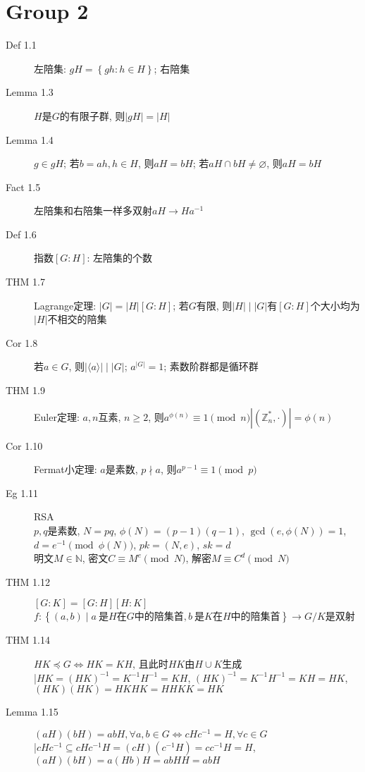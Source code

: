 \documentclass{article}
\renewcommand{\l}{\left}
\renewcommand{\r}{\right}
\begin{document}
    \section{Group 2}
    \begin{description}
        \item[Def 1.1] 左陪集: $gH = \l\{ gh : h \in H \r\}$; 右陪集
        \item[Lemma 1.3] $H$是$G$的有限子群, 则$\l| gH \r| = \l| H \r|$
        \item[Lemma 1.4] $g \in gH$; 若$b = ah, h \in H$, 则$aH = bH$; 若$aH \cap bH \ne \varnothing$, 则$aH = bH$
        \item[Fact 1.5] 左陪集和右陪集一样多\hfill 双射$aH \to Ha^{-1}$
        \item[Def 1.6] 指数$[G:H]$: 左陪集的个数
        \item[THM 1.7] Lagrange定理: $\l|G\r| = \l|H\r|[G:H]$; 若$G$有限, 则$\l|H\r| \mid \l|G\r|$\hfill 有$[G:H]$个大小均为$\l|H\r|$不相交的陪集
        \item[Cor 1.8] 若$a \in G$, 则$\l| \langle a \rangle \r| \mid \l|G\r|$; $a^{\l|G\r|} = 1$; 素数阶群都是循环群
        \item[THM 1.9] Euler定理: $a, n$互素, $n \ge 2$, 则$a^{\phi(n)} \equiv 1 \pmod n$\hfill$\l|(\mathbb Z_n^\ast, \cdot)\r| = \phi(n)$
        \item[Cor 1.10] Fermat小定理: $a$是素数, $p \nmid a$, 则$a^{p-1} \equiv 1 \pmod p$
        \item[Eg 1.11] RSA\\
            $p, q$是素数, $N = pq$, $\phi(N) = (p - 1)(q - 1)$, $\gcd(e, \phi(N)) = 1$, $d = e^{-1} \pmod{\phi(N)}$, $pk = (N, e)$, $sk = d$\\
            明文$M \in \mathbb N$, 密文$C \equiv M^e \pmod N$, 解密$M \equiv C^d \pmod N$
        \item[THM 1.12] $[G:K] = [G:H][H:K]$\hfill$f : \l\{(a, b) \mid a~\text{是$H$在$G$中的陪集首}, b~\text{是$K$在$H$中的陪集首}\r\} \to G/K$是双射
        \item[THM 1.14] $HK \preceq G \iff HK = KH$, 且此时$HK$由$H \cup K$生成\\
            |\hfill$HK = (HK)^{-1} = K^{-1}H^{-1} = KH$, $(HK)^{-1} = K^{-1}H^{-1} = KH = HK$, $(HK)(HK) = HKHK = HHKK = HK$
        \item[Lemma 1.15] $(aH)(bH) = abH, \forall a, b \in G \iff cHc^{-1} = H, \forall c \in G$\\
            |\hfill$cHc^{-1} \subseteq cHc^{-1}H = (cH)(c^{-1}H) = cc^{-1}H = H$, $(aH)(bH) = a(Hb)H = abHH = abH$

\end{description}
\end{document}
